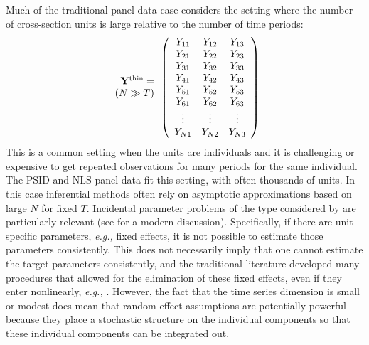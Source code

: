 \documentclass[letterpaper,12pt,leqno]{article}
\newcommand{\tall}{{\rm thin}}
\newcommand{\by}{{\bf Y}}
\begin{document}
Much of the traditional panel data case considers the setting where the number of cross-section units is large relative to the number of time periods:
\[
\begin{array}{r}\by^\tall=\\ 
(N\gg T)
\end{array}
\left(
\begin{array}{ccccccc}
	Y_{11} & Y_{12} & Y_{13}   \\
	Y_{21}  & Y_{22} & Y_{23}   \\
	Y_{31}  & Y_{32} &  Y_{33}    \\
		Y_{41}  & Y_{42} & Y_{43}   \\
		Y_{51}  & Y_{52} & Y_{53}  \\	
	Y_{61}  & Y_{62} & Y_{63}    \\
	\vdots   &  \vdots & \vdots \\
	Y_{N1}  & Y_{N2} &  Y_{N3}    \\
\end{array}
\right)\]
This is a common setting when the units are individuals and it is challenging or expensive to get repeated observations for many periods for the same individual. The PSID and NLS panel data fit this setting, with often thousands of units. In this case inferential methods often rely on asymptotic approximations based on large $N$ for fixed $T$. Incidental parameter problems of the type considered by \citep{neyman1948consistent} are particularly relevant (see \citep{lancaster2000incidental} for a modern discussion). Specifically, if there are unit-specific parameters, {\it e.g.,} fixed effects, it is not possible to estimate those parameters consistently. This does not necessarily imply that one cannot estimate the target parameters consistently, and the traditional literature developed many procedures that allowed for the elimination of these fixed effects, even if they enter nonlinearly, {\it e.g.,} \citep{honore1992trimmed, chamberlain2010binary,bonhomme2012functional}. However, the fact that the time series dimension is small or modest does mean that random effect assumptions are potentially powerful because they place a stochastic structure on the individual components so that these individual components can be integrated out.
\end{document}
